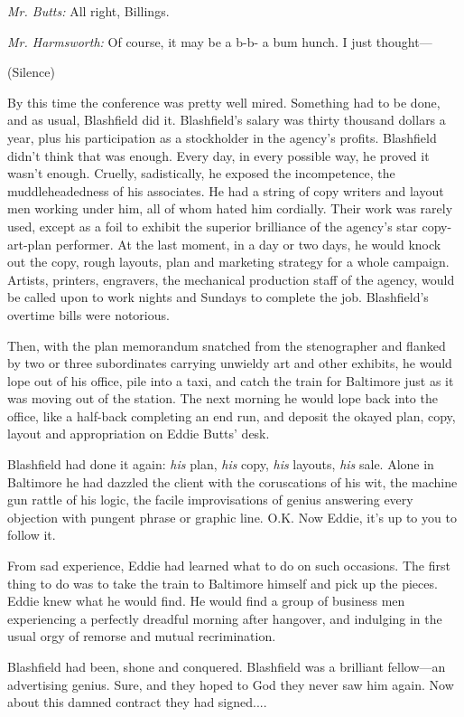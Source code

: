 \documentclass[nohyper,openany,nobib]{tufte-book}
\begin{document}
\emph{Mr. Butts:} All right, Billings.

\emph{Mr. Harmsworth:} Of course, it may be a b-b- a bum hunch. I just
thought---

(Silence)

By this time the conference was pretty well mired. Something had to be
done, and as usual, Blashfield did it. Blashfield's salary was thirty
thousand dollars a year, plus his participation as a stockholder in the
agency's profits. Blashfield didn't think that was enough. Every day, in
every possible way, he proved it wasn't enough. Cruelly, sadistically,
he exposed the incompetence, the muddleheadedness of his associates. He
had a string of copy writers and layout men working under him, all of
whom hated him cordially. Their work was rarely used, except as a foil
to exhibit the superior brilliance of the agency's star copy-art-plan
performer. At the last moment, in a day or two days, he would knock out
the copy, rough layouts, plan and marketing strategy for a whole
campaign. Artists, printers, engravers, the mechanical production staff
of the agency, would be called upon to work nights and Sundays to
complete the job. Blashfield's overtime bills were notorious.

Then, with the plan memorandum snatched from the stenographer and
flanked by two or three subordinates carrying unwieldy art and other
exhibits, he would lope out of his office, pile into a taxi, and catch
the train for Baltimore just as it was moving out of the station. The
next morning he would lope back into the office, like a half-back
completing an end run, and deposit the okayed plan, copy, layout and
appropriation on Eddie Butts' desk.

Blashfield had done it again: \emph{his} plan, \emph{his} copy,
\emph{his} layouts, \emph{his} sale. Alone in Baltimore he had dazzled
the client with the coruscations of his wit, the machine gun rattle of
his logic, the facile improvisations of genius answering every objection
with pungent phrase or graphic line. O.K. Now Eddie, it's up to you to
follow it.

From sad experience, Eddie had learned what to do on such occasions. The
first thing to do was to take the train to Baltimore himself and pick up
the pieces. Eddie knew what he would find. He would find a group of
business men experiencing a perfectly dreadful morning after hangover,
and indulging in the usual orgy of remorse and mutual recrimination.

Blashfield had been, shone and conquered. Blashfield was a brilliant
fellow---an advertising genius. Sure, and they hoped to God they never
saw him again. Now about this damned contract they had signed....
\end{document}
